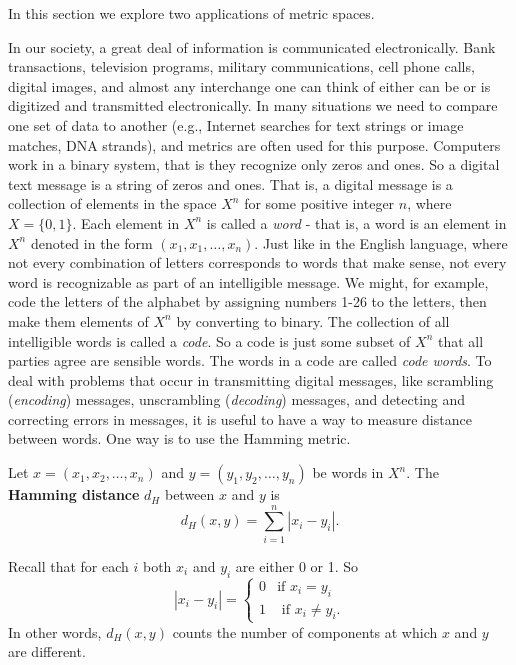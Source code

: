  \label{sec:metric_spaces_apps}


In this section we explore two applications of metric spaces.  


In our society, a great deal of information is communicated electronically. Bank transactions, television programs, military communications, cell phone calls, digital images, and almost any interchange one can think of either can be or is digitized and transmitted electronically. In many situations we need to compare one set of data to another (e.g., Internet searches for text strings or image matches, DNA strands), and metrics are often used for this purpose. Computers work in a binary system, that is they recognize only zeros and ones. So a digital text message is a string of zeros and ones. That is, a digital message is a collection of  elements in the space $X^n$ for some positive integer $n$, where $X = \{0,1\}$. Each element in $X^n$ is called a \emph{word} - that is, a word is an element in $X^n$ denoted in the form $(x_1, x_1, \ldots, x_n)$. Just like in the English language, where not every combination of letters corresponds to words that make sense, not every word is recognizable as part of an intelligible message. We might, for example, code the letters of the alphabet by assigning numbers 1-26 to the letters, then make them elements of $X^n$ by converting to binary. The collection of all intelligible words is called a \emph{code}. So a code is just some subset of $X^n$ that all parties agree are sensible words. The words in a code are called \emph{code words}. To deal with problems that occur in transmitting digital messages, like scrambling (\emph{encoding}) messages, unscrambling (\emph{decoding}) messages, and detecting and correcting errors in messages, it is useful to have a way to measure distance between words. One way is to use the Hamming metric. 

\begin{definition} Let $x = (x_1, x_2, \ldots, x_n)$ and $y = (y_1, y_2, \ldots, y_n)$ be words in $X^n$. The \textbf{Hamming distance}  $d_H$ between $x$ and $y$ is 
\[d_H(x,y) = \sum_{i=1}^n | x_i-y_i |.\]
\end{definition}

Recall that for each $i$ both $x_i$ and $y_i$ are either 0 or 1. So 
\[| x_i-y_i | = \begin{cases} 0 &\text{if } x_i=y_i \\ 1 &\text{ if } x_i \neq y_i. \end{cases}\]
In other words, $d_H(x,y)$ counts the number of components at which $x$ and $y$ are different.

